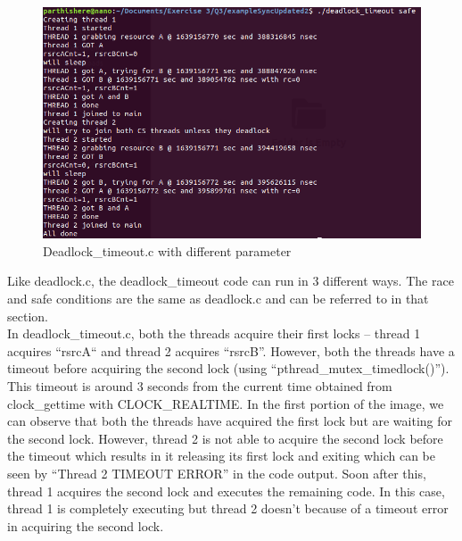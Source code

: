 \documentclass[a4paper,11pt]{article}%
\newenvironment{qanda}{\setlength{\parindent}{0pt}}{\bigskip}
\begin{document}
\begin{qanda}
\begin{enumerate}
\begin{enumerate}
\begin{enumerate}
								\begin{figure}[H]
									\centering
									\includegraphics[scale=0.6]{figures/timeout_safe.png}
									\caption{Deadlock\_timeout.c with different parameter}
								\end{figure}

					            Like deadlock.c, the deadlock\_timeout code can run in 3 different ways. The race and safe conditions are the same as deadlock.c and can be referred to in that section.\\
					            In deadlock\_timeout.c, both the threads acquire their first locks – thread 1 acquires “rsrcA“ and thread 2 acquires “rsrcB”. However, both the threads have a timeout before acquiring the second lock (using “pthread\_mutex\_timedlock()”). This timeout is around 3 seconds from the current time obtained from clock\_gettime with CLOCK\_REALTIME. In the first portion of the image, we can observe that both the threads have acquired the first lock but are waiting for the second lock. However, thread 2 is not able to acquire the second lock before the timeout which results in it releasing its first lock and exiting which can be seen by “Thread 2 TIMEOUT ERROR” in the code output. Soon after this, thread 1 acquires the second lock and executes the remaining code. In this case, thread 1 is completely executing but thread 2 doesn’t because of a timeout error in acquiring the second lock.\\\\


\end{enumerate}
\end{enumerate}
\end{enumerate}
\end{qanda}
\end{document}
